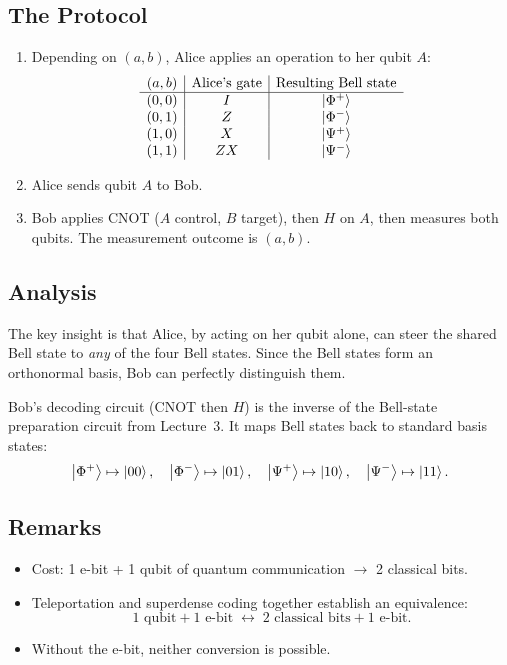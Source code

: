\documentclass[11pt]{article}
\theoremstyle{definition}
\begin{document}
\subsection{The Protocol}

\begin{enumerate}
    \item Depending on $(a,b)$, Alice applies an operation to her qubit $A$:
    \[
    \begin{array}{c|c|c}
    (a,b) & \text{Alice's gate} & \text{Resulting Bell state} \\\hline
    (0,0) & I   & \ket{\Phi^+} \\
    (0,1) & Z   & \ket{\Phi^-} \\
    (1,0) & X   & \ket{\Psi^+} \\
    (1,1) & ZX  & \ket{\Psi^-}
    \end{array}
    \]
    \item Alice sends qubit $A$ to Bob.
    \item Bob applies CNOT ($A$ control, $B$ target), then $H$ on $A$, then measures both qubits.  The measurement outcome is $(a,b)$.
\end{enumerate}

\subsection{Analysis}

The key insight is that Alice, by acting on her qubit alone, can steer the shared Bell state to \emph{any} of the four Bell states.  Since the Bell states form an orthonormal basis, Bob can perfectly distinguish them.

Bob's decoding circuit (CNOT then $H$) is the inverse of the Bell-state preparation circuit from Lecture~3.  It maps Bell states back to standard basis states:
\[
    \ket{\Phi^+}\mapsto\ket{00},\quad
    \ket{\Phi^-}\mapsto\ket{01},\quad
    \ket{\Psi^+}\mapsto\ket{10},\quad
    \ket{\Psi^-}\mapsto\ket{11}.
\]

\subsection{Remarks}

\begin{itemize}
    \item Cost: 1 e-bit + 1 qubit of quantum communication $\longrightarrow$ 2 classical bits.
    \item Teleportation and superdense coding together establish an equivalence:
    \[
        1\text{ qubit} + 1\text{ e-bit} \;\longleftrightarrow\; 2\text{ classical bits} + 1\text{ e-bit}.
    \]
    \item Without the e-bit, neither conversion is possible.
\end{itemize}
\end{document}
